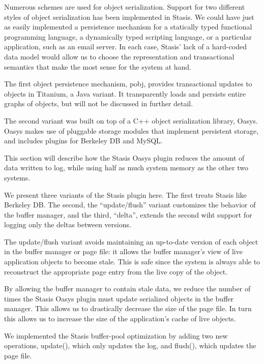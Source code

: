 \documentclass[letterpaper,twocolumn,10pt]{article}
\newcommand{\yad}{Stasis\xspace}
\newcommand{\yads}{Stasis'\xspace}
\newcommand{\oasys}{Oasys\xspace}
\begin{document}
Numerous schemes are used for object serialization.  Support for two
different styles of object serialization has been implemented in
\yad.  We could have just as easily implemented a persistence
mechanism for a statically typed functional programming language, a
dynamically typed scripting language, or a particular application,
such as an email server.  In each case, \yads lack of a hard-coded data
model would allow us to choose the representation and transactional
semantics that make the most sense for the system at hand.

The first object persistence mechanism, pobj, provides transactional updates to objects in
Titanium, a Java variant.  It transparently loads and persists
entire graphs of objects, but will not be discussed in further detail.

The second variant was built on top of a C++ object
serialization library, \oasys.  \oasys makes use of pluggable storage
modules that implement persistent storage, and includes plugins
for Berkeley DB and MySQL.  

This section will describe how the \yad \oasys plugin reduces the
amount of data written to log, while using half as much system memory
as the other two systems.

We present three variants of the \yad plugin here.  The first treats
\yad like Berkeley DB.  The second, the ``update/flush'' variant
customizes the behavior of the buffer manager, and the third,
``delta'', extends the second wiht support for logging only the deltas
between versions.

The update/flush variant avoids maintaining an up-to-date
version of each object in the buffer manager or page file: it allows
the buffer manager's view of live application objects to become stale.
This is safe since the system is always able to reconstruct the
appropriate page entry from the live copy of the object.

By allowing the buffer manager to contain stale data, we reduce the
number of times the \yad \oasys plugin must update serialized objects in the buffer manager.
This allows us to drastically decrease the
size of the page file.  In turn this allows us to increase the size of
the application's cache of live objects.

We implemented the \yad buffer-pool optimization by adding two new
operations, update(), which only updates the log, and flush(), which
updates the page file.  
\end{document}
